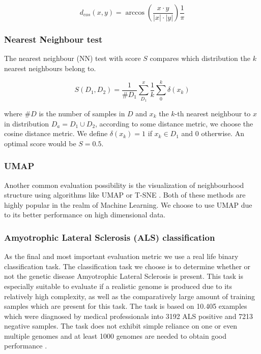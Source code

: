 \begin{equation}
    d_{cos}(x,y) = \arccos(\frac{x\cdot y}{|x|\cdot|y|}) \frac{1}{\pi}
\end{equation}

\subsubsection{Nearest Neighbour test}
The nearest neighbour (NN) test with score $S$ compares which distribution the $k$ nearest neighbours belong to.

\begin{equation}
    S(D_1,D_2) = \frac{1}{\#D_1} \sum_{D_1}^x \frac{1}{k}\sum_0^k \delta(x_{k})
\end{equation}

where $\#D$ is the number of samples in $D$ and $x_{k}$ the $k$-th nearest neighbour to $x$ in distribution $D_a = D_1 \cup D_2$, according to some distance metric, we choose the cosine distance metric. We define $\delta(x_k) = 1$ if $x_{k}\in D_1$ and 0 otherwise. An optimal score would be $S = 0.5$.

\subsubsection{UMAP}
Another common evaluation possibility is the visualization of neighbourhood structure using algorithms like UMAP \citep{UMAP} or T-SNE \citep{tsne}. Both of these methods are highly popular in the realm of Machine Learning. We choose to use UMAP due to its better performance on high dimensional data.


\subsubsection{Amyotrophic Lateral Sclerosis (ALS) classification}
As the final and most important evaluation metric we use a real life binary classification task. The classification task we choose is to determine whether or not the genetic disease Amyotrophic Lateral Sclerosis is present. This task is especially suitable to evaluate if a realistic genome is produced due to its relatively high complexity, as well as the comparatively large amount of training samples which are present for this task. The task is based on 10.405 examples which were diagnosed by medical professionals into 3192 ALS positive and 7213 negative samples. The task does not exhibit simple reliance on one or even multiple genomes and at least 1000 genomes are needed to obtain good performance \citep{capsulenet}.  

